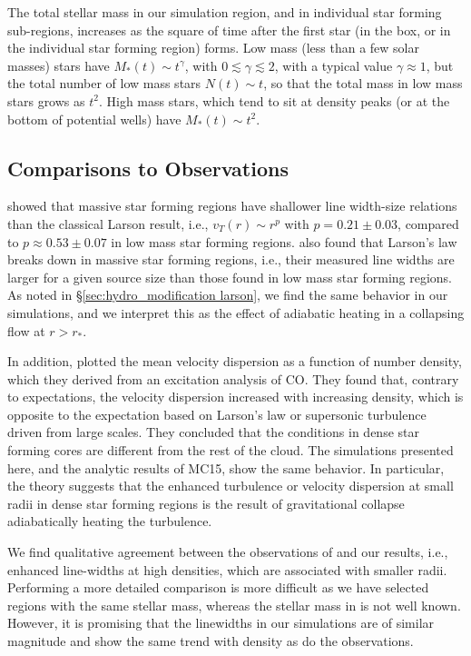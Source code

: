 \documentclass[../dissertation.tex]{subfiles}
\begin{document}
The total stellar mass in our simulation region, and in individual star forming
sub-regions, increases as the square of time after the first star (in the box,
or in the individual star forming region) forms.
%
Low mass (less than a few solar masses) stars have $M_*(t)\sim t^\gamma$, with
$0\lesssim\gamma\lesssim 2$, with a typical value $\gamma\approx1$, but the total 
number of low mass stars
 $N(t)\sim t$, so that the total mass in low mass stars grows as $t^2$. High 
mass stars, which tend to sit at density peaks (or at the bottom of potential
 wells) have $M_*(t)\sim t^2$.

\subsection{Comparisons to Observations}

\citet{1995ApJ...446..665C} showed that massive star forming regions have shallower 
line width-size relations than the classical Larson result, i.e., $v_T(r)\sim r^p$ 
with $p= 0.21\pm 0.03$, compared to $p\approx0.53\pm 0.07$ in low mass star 
forming regions. \citet{1997ApJ...476..730P} also found that Larson's law breaks 
down in massive star forming regions, i.e., their measured line widths are 
larger for a given source size than those found in low mass star forming regions.
As noted in \S \ref{sec:hydro_modification larson}, we find the same behavior in our
simulations, and we interpret this as the effect of adiabatic heating in a 
collapsing flow at $r>r_*$. 

%
In addition, \citet{1997ApJ...476..730P} plotted the mean velocity 
dispersion as a function of number density, which they derived 
from an excitation analysis of CO. 
They found that, contrary to expectations, the velocity dispersion increased with increasing density, 
which is opposite to the expectation based on Larson's law or supersonic turbulence driven from large scales. 
They concluded that the conditions in dense star forming cores 
are different from the rest of the cloud. The simulations presented here, and the 
analytic results of MC15, show the same behavior. In particular, the theory suggests 
that the enhanced turbulence or velocity dispersion at small radii in dense star 
forming regions is the result of gravitational collapse adiabatically heating the 
turbulence. 


We find qualitative agreement between the observations of \citet{1997ApJ...476..730P} 
and our results, i.e., enhanced line-widths at high 
densities, which are associated with smaller radii.
Performing a more detailed 
comparison is more difficult as we have selected regions with the same stellar 
mass, whereas the stellar mass in \citet{1997ApJ...476..730P} is not well known.  
However, it is promising that the linewidths in our simulations are of similar 
magnitude and show the same trend with density as do the observations.
\end{document}
